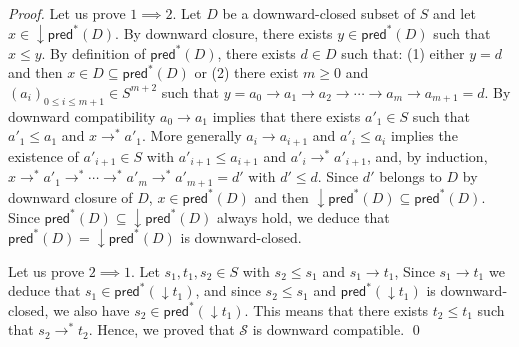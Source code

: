 \documentclass[runningheads]{llncs}
\newcommand{\pred}{\textsf{pred}}
\newcommand{\post}{\textsf{post}}
\begin{document}
\begin{proof}
Let us prove $1 \implies 2$. 
Let $D$ be a downward-closed subset of $S$
and let $x \in \mathop{\downarrow} \pred^*(D)$.
By downward closure, there exists
$y \in \pred^*(D)$ 
such that $x \leq y$.
By definition of $\pred^*(D)$, there exists 
$d \in D$ such that: (1) either $y=d$ and then $x \in D \subseteq \pred^*(D)$ or (2) there exist $m\geq 0$ and $(a_i)_{0 \leq i \leq m+1} \in S^{m+2}$ such that
$y = a_0 \to a_1 \to a_2 \to \cdots \to a_m \to a_{m+1} = d$.
%
By downward compatibility $a_0 \to a_1$
implies that there exists $a'_1 \in S$ such that $a'_1 \leq a_1$ and
$x \to^* a'_1$.
More generally $a_i \to a_{i+1}$ and
$a'_i\leq a_i$ implies the existence of $a'_{i+1} \in S$ with $a'_{i+1} \leq a_{i+1}$ and
$a'_i \to^* a'_{i+1}$,
and, by induction,
 $x \to^* a'_1 \to^* \cdots \to^* a'_{m} \to^* a'_{m+1} = d'$
with $d' \leq d$.
Since
$d'$ 
belongs to $D$ by downward closure of $D$, $x \in \pred^*(D)$ and then $\mathop{\downarrow}\pred^*(D) \subseteq \pred^*(D)$. Since $\pred^*(D) \subseteq \mathop{\downarrow} \pred^*(D)$ always hold, we deduce that $\pred^*(D)=\mathop{\downarrow}\pred^*(D)$ is downward-closed.

Let us prove $2 \implies 1$. Let $s_1, t_1 , s_2 \in S$ with $s_2 \leq s_1$  and $s_1 \rightarrow t_1$, Since $s_1 \rightarrow t_1$ we deduce that $s_1 \in \pred^*(\mathop{\downarrow} t_1)$, and since $s_2 \leq s_1$ and $\pred^*(\mathop{\downarrow} t_1)$ is downward-closed, we also have $s_2 \in \pred^*(\mathop{\downarrow} t_1)$. This means that there exists $t_2 \leq t_1$ such that 
$s_2 \rightarrow^{*} t_2$. Hence, we proved that $\mathscr{S}$ is downward compatible.
\qed
\end{proof}

\end{document}
